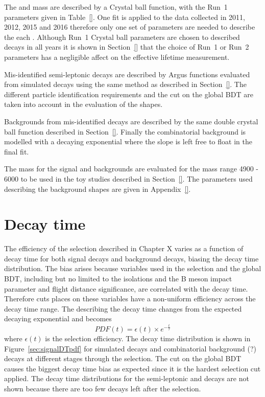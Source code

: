 
The \bsmumu and \bdmumu mass \pdfs are described by a Crystal ball function, with the Run~1 parameters given in Table~\ref{}. One \ml fit is applied to the data collected in 2011, 2012, 2015 and 2016 therefore only one set of parameters are needed to describe the each \pdf. Although Run~1 Crystal ball parameters are chosen to described \bmumu decays in all years it is shown in Section~\ref{} that the choice of Run~1 or Run~2 parameters has a negligible affect on the effective lifetime measurement. 

Mis-identified semi-leptonic decays are described by Argus functions evaluated from simulated decays using the same method as described in Section~\ref{}. The different particle identification requirements and the cut on the global BDT are taken into account in the evaluation of the \pdf shapes.

Backgrounds from mis-identified \bhh decays are described by the same double crystal ball function described in Section~\ref{}. Finally the combinatorial background is modelled with a decaying exponential where the slope is left free to float in the final fit.

The mass \pdfs for the signal and backgrounds are evaluated for the mass range 4900 - 6000 \mevcc to be used in the toy studies described in Section~\ref{}. The parameters used describing the background shapes are given in Appendix~\ref{}.


\section{Decay time \pdfs}
\label{sec:DTpdfs}
The efficiency of the selection described in Chapter X varies as a function of decay time for both signal \bsmumu decays and background decays, biasing the decay time distribution. The bias arises because variables used in the selection and the global BDT, including but no limited to the isolations and the B meson impact parameter and flight distance significance, are correlated with the decay time. Therefore cuts places on these variables have a non-uniform efficiency across the decay time range. The \pdf describing the decay time changes from the expected decaying exponential and becomes
\begin{equation}
PDF(t) = \epsilon(t) \times e^{-\frac{t}{\tau}}
\end{equation}
where $\epsilon(t)$ is the selection efficiency. 
The decay time distribution is shown in Figure~\ref{sec:signalDTpdf} for simulated \bsmumu decays and combinatorial background (?) decays at different stages through the selection. The cut on the global BDT causes the biggest decay time bias as expected since it is the hardest selection cut applied. The decay time distributions for the semi-leptonic and \bhh decays are not shown because there are too few decays left after the selection.


